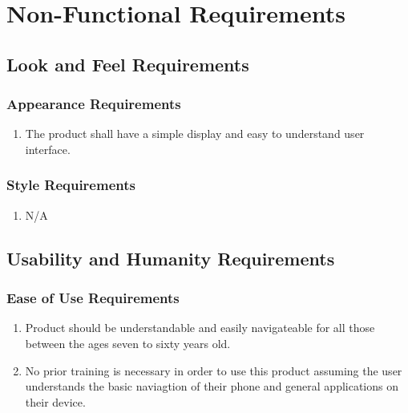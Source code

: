 \documentclass[]{article}
\begin{document}

\section{Non-Functional Requirements}
\label{sec:non-functional_requirements}
\subsection{Look and Feel Requirements}
\label{sub:look_and_feel_requirements}

\subsubsection{Appearance Requirements}
\label{ssub:appearance_requirements}
\begin{enumerate}[{LF}1. ]
	\item The product shall have a simple display and easy to understand user interface.
\end{enumerate}

\subsubsection{Style Requirements}
\label{ssub:style_requirements}
\begin{enumerate}[{LF}1. ]
	\item N/A
\end{enumerate}


\subsection{Usability and Humanity Requirements}
\label{sub:usability_and_humanity_requirements}

\subsubsection{Ease of Use Requirements}
\label{ssub:ease_of_use_requirements}
\begin{enumerate}[{UH}1. ]
	\item Product should be understandable and easily navigateable for all those between the ages seven to sixty years old.
	\item No prior training is necessary in order to use this product assuming the user understands the basic naviagtion of their phone and general applications on their device.
\end{enumerate}
\end{document}
